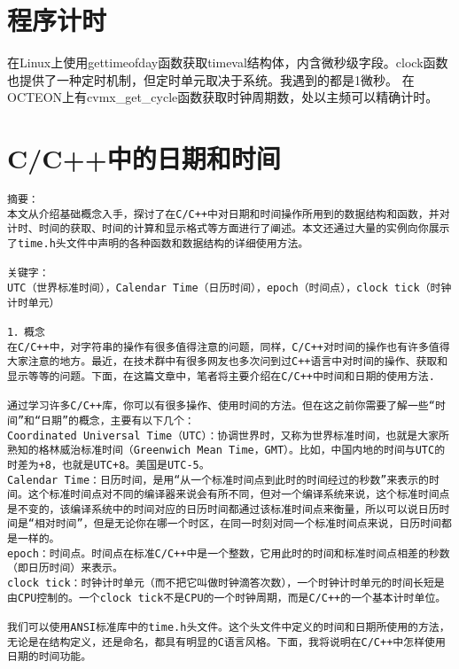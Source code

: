 \section{程序计时}
在Linux上使用gettimeofday函数获取timeval结构体，内含微秒级字段。clock函数也提供了一种定时机制，但定时单元取决于系统。我遇到的都是1微秒。
在OCTEON上有cvmx\_get\_cycle函数获取时钟周期数，处以主频可以精确计时。
\section{C/C++中的日期和时间}
\begin{verbatim}
摘要： 
本文从介绍基础概念入手，探讨了在C/C++中对日期和时间操作所用到的数据结构和函数，并对计时、时间的获取、时间的计算和显示格式等方面进行了阐述。本文还通过大量的实例向你展示了time.h头文件中声明的各种函数和数据结构的详细使用方法。 

关键字： 
UTC（世界标准时间），Calendar Time（日历时间），epoch（时间点），clock tick（时钟计时单元） 

1．概念 
在C/C++中，对字符串的操作有很多值得注意的问题，同样，C/C++对时间的操作也有许多值得大家注意的地方。最近，在技术群中有很多网友也多次问到过C++语言中对时间的操作、获取和显示等等的问题。下面，在这篇文章中，笔者将主要介绍在C/C++中时间和日期的使用方法.

通过学习许多C/C++库，你可以有很多操作、使用时间的方法。但在这之前你需要了解一些“时间”和“日期”的概念，主要有以下几个： 
Coordinated Universal Time（UTC）：协调世界时，又称为世界标准时间，也就是大家所熟知的格林威治标准时间（Greenwich Mean Time，GMT）。比如，中国内地的时间与UTC的时差为+8，也就是UTC+8。美国是UTC-5。 
Calendar Time：日历时间，是用“从一个标准时间点到此时的时间经过的秒数”来表示的时间。这个标准时间点对不同的编译器来说会有所不同，但对一个编译系统来说，这个标准时间点是不变的，该编译系统中的时间对应的日历时间都通过该标准时间点来衡量，所以可以说日历时间是“相对时间”，但是无论你在哪一个时区，在同一时刻对同一个标准时间点来说，日历时间都是一样的。 
epoch：时间点。时间点在标准C/C++中是一个整数，它用此时的时间和标准时间点相差的秒数（即日历时间）来表示。 
clock tick：时钟计时单元（而不把它叫做时钟滴答次数），一个时钟计时单元的时间长短是由CPU控制的。一个clock tick不是CPU的一个时钟周期，而是C/C++的一个基本计时单位。 

我们可以使用ANSI标准库中的time.h头文件。这个头文件中定义的时间和日期所使用的方法，无论是在结构定义，还是命名，都具有明显的C语言风格。下面，我将说明在C/C++中怎样使用日期的时间功能。 


\end{verbatim}
